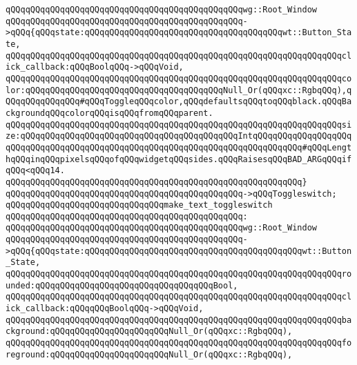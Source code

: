 \verb|qQQqqQQqqQQqqQQqqQQqqQQqqQQqqQQqqQQqqQQqqQQqqQQqwg::Root_Window|\newline
\verb|qQQqqQQqqQQqqQQqqQQqqQQqqQQqqQQqqQQqqQQqqQQqqQQq->qQQq{qQQqstate:qQQqqQQqqQQqqQQqqQQqqQQqqQQqqQQqqQQqqQQqwt::Button_State,|\newline
\verb|qQQqqQQqqQQqqQQqqQQqqQQqqQQqqQQqqQQqqQQqqQQqqQQqqQQqqQQqqQQqqQQqqQQqclick_callback:qQQqBoolqQQq->qQQqVoid,|\newline
\verb|qQQqqQQqqQQqqQQqqQQqqQQqqQQqqQQqqQQqqQQqqQQqqQQqqQQqqQQqqQQqqQQqqQQqcolor:qQQqqQQqqQQqqQQqqQQqqQQqqQQqqQQqqQQqqQQqNull_Or(qQQqxc::RgbqQQq),qQQqqQQqqQQqqQQq#qQQqToggleqQQqcolor,qQQqdefaultsqQQqtoqQQqblack.qQQqBackgroundqQQqcolorqQQqisqQQqfromqQQqparent.|\newline
\verb|qQQqqQQqqQQqqQQqqQQqqQQqqQQqqQQqqQQqqQQqqQQqqQQqqQQqqQQqqQQqqQQqqQQqsize:qQQqqQQqqQQqqQQqqQQqqQQqqQQqqQQqqQQqqQQqqQQqIntqQQqqQQqqQQqqQQqqQQqqQQqqQQqqQQqqQQqqQQqqQQqqQQqqQQqqQQqqQQqqQQqqQQqqQQqqQQqqQQq#qQQqLengthqQQqinqQQqpixelsqQQqofqQQqwidgetqQQqsides.qQQqRaisesqQQqBAD_ARGqQQqifqQQq<qQQq14.|\newline
\verb|qQQqqQQqqQQqqQQqqQQqqQQqqQQqqQQqqQQqqQQqqQQqqQQqqQQqqQQqqQQq}|\newline
\verb|qQQqqQQqqQQqqQQqqQQqqQQqqQQqqQQqqQQqqQQqqQQqqQQq->qQQqToggleswitch;|\newline
\newline
\verb|qQQqqQQqqQQqqQQqqQQqqQQqqQQqqQQqmake_text_toggleswitch|\newline
\verb|qQQqqQQqqQQqqQQqqQQqqQQqqQQqqQQqqQQqqQQqqQQqqQQq:|\newline
\verb|qQQqqQQqqQQqqQQqqQQqqQQqqQQqqQQqqQQqqQQqqQQqqQQqwg::Root_Window|\newline
\verb|qQQqqQQqqQQqqQQqqQQqqQQqqQQqqQQqqQQqqQQqqQQqqQQq->qQQq{qQQqstate:qQQqqQQqqQQqqQQqqQQqqQQqqQQqqQQqqQQqqQQqqQQqwt::Button_State,|\newline
\verb|qQQqqQQqqQQqqQQqqQQqqQQqqQQqqQQqqQQqqQQqqQQqqQQqqQQqqQQqqQQqqQQqqQQqrounded:qQQqqQQqqQQqqQQqqQQqqQQqqQQqqQQqqQQqBool,|\newline
\verb|qQQqqQQqqQQqqQQqqQQqqQQqqQQqqQQqqQQqqQQqqQQqqQQqqQQqqQQqqQQqqQQqqQQqclick_callback:qQQqqQQqBoolqQQq->qQQqVoid,|\newline
\verb|qQQqqQQqqQQqqQQqqQQqqQQqqQQqqQQqqQQqqQQqqQQqqQQqqQQqqQQqqQQqqQQqqQQqbackground:qQQqqQQqqQQqqQQqqQQqqQQqNull_Or(qQQqxc::RgbqQQq),|\newline
\verb|qQQqqQQqqQQqqQQqqQQqqQQqqQQqqQQqqQQqqQQqqQQqqQQqqQQqqQQqqQQqqQQqqQQqforeground:qQQqqQQqqQQqqQQqqQQqqQQqNull_Or(qQQqxc::RgbqQQq),|\newline
